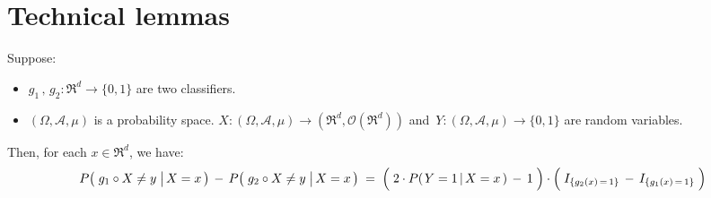 

\section{Technical lemmas}
\setcounter{theorem}{0}
\setcounter{equation}{0}


\renewcommand{\theenumi}{\roman{enumi}}
\renewcommand{\labelenumi}{\textnormal{(\theenumi)}$\;\;$}


\begin{lemma}\label{lemma:conditionalProbabilityOfError}
\mbox{}\vskip 0.1cm
\noindent
Suppose:
\begin{itemize}
\item
	$g_{1} \,,\, g_{2} : \Re^{d} \longrightarrow \{0,1\}$ are two classifiers.
\item
	$(\Omega,\mathcal{A},\mu)$ is a probability space.
	$X : (\Omega,\mathcal{A},\mu) \longrightarrow (\Re^{d},\mathcal{O}(\Re^{d}))$ and\,
	$Y : (\Omega,\mathcal{A},\mu) \longrightarrow \{0,1\}$
	are random variables.
\end{itemize}
Then, for each $x \in \Re^{d}$, we have:
\begin{equation*}
P\!\left(\,\left. g_{1} \overset{{\color{white}.}}{\circ} X \neq y \;\right\vert X = x \,\right)
\, - \,
P\!\left(\,\left. g_{2} \overset{{\color{white}.}}{\circ} X \neq y \;\right\vert X = x \,\right)
\; = \;
	\left(\; 2 \cdot P\!\left(\left.Y=1\,\right\vert X =x \,\right) \,\overset{{\color{white}.}}{-}\, 1 \;\right)
	\cdot
	\left(\; I_{\{g_{2}(x)\,=\,1\}} \,\overset{{\color{white}.}}{-}\, I_{\{g_{1}(x)\,=\,1\}} \;\right)
\end{equation*}
\end{lemma}
\proof

